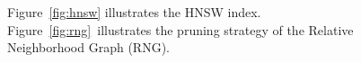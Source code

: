 \begin{figure}[!t]
\begin{center}
\caption{Figure~\ref{fig:hnsw} illustrates the HNSW index. Figure~\ref{fig:rng}~illustrates the pruning strategy of the Relative Neighborhood Graph (RNG).}
\label{fig:hnsw-rng}
\end{center}
\end{figure}

